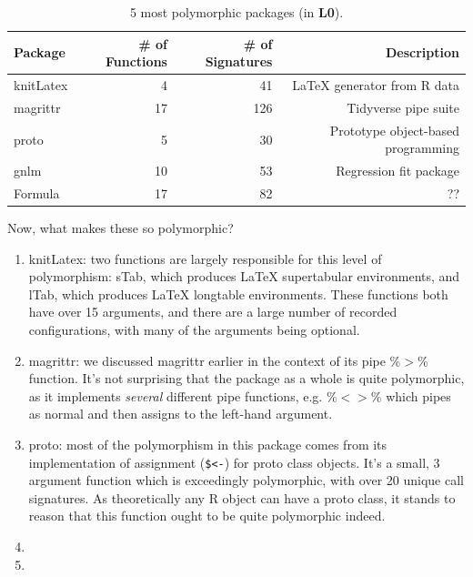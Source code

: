 \documentclass[acmsmall,10pt,review,anonymous]{acmart}\settopmatter{printfolios=true,printccs=false,printacmref=false}
\begin{document}
\begin{table}[ht]
\label{tab:packagepolysize}
\centering
\begin{tabular}{lrrr}
  \hline
  Package & \# of Functions &\# of Signatures & Description \\ 
  \hline
  knitLatex & 4 & 41 & \LaTeX \xspace generator from R data \\ 
  magrittr & 17 & 126 & Tidyverse pipe suite \\ 
  proto & 5 & 30 & Prototype object-based programming \\ 
  gnlm & 10 & 53 & Regression fit package \\ 
  Formula & 17 & 82 & ?? \\ 
   \hline
\end{tabular}
\caption{5 most polymorphic packages (in {\bf L0}).}
\end{table}

Now, what makes these so polymorphic?


\begin{enumerate}

	\item knitLatex: two functions are largely responsible for this level of polymorphism: sTab, which produces \LaTeX \xspace supertabular environments, and lTab, which produces \LaTeX \xspace longtable environments.
	These functions both have over 15 arguments, and there are a large number of recorded configurations, with many of the arguments being optional.
	
	\item magrittr: we discussed magrittr earlier in the context of its pipe \%$>$\% function. 
	It's not surprising that the package as a whole is quite polymorphic, as it implements {\it several} different pipe functions, e.g. \%$<>$\% which pipes as normal and then assigns to the left-hand argument.
	
	\item proto: most of the polymorphism in this package comes from its implementation of assignment ({\tt \$<-}) for proto class objects.
	It's a small, 3 argument function which is exceedingly polymorphic, with over 20 unique call signatures.
	As theoretically any R object can have a proto class, it stands to reason that this function ought to be quite polymorphic indeed.
	
	\item 
	
	\item 

\end{enumerate}
\end{document}
